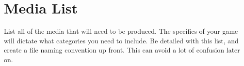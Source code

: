 \chapter{Media List}
List all of the media that will need to be produced. The specifics of your game
will dictate what categories you need to include. Be detailed with this list,
and create a file naming convention up front. This can avoid a lot of confusion
later on.






